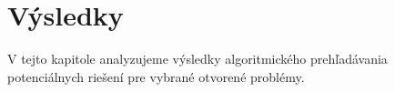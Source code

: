 \chapter{Výsledky}

\label{kap:results} %

V tejto kapitole analyzujeme výsledky algoritmického prehľadávania potenciálnych riešení pre vybrané otvorené problémy.

